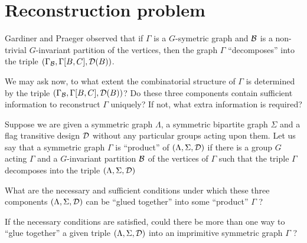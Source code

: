 \section{Reconstruction problem}

Gardiner and Praeger observed that if $\Gamma$ is a $G$-symetric graph
and $\mathcal{B}$ is a non-trivial $G$-invariant partition of the vertices,
then the graph $\Gamma$ ``decomposes''
into the triple $(\Gamma_{\mathcal{B}}, \Gamma[B,C], \mathcal{D}(B))$.

We may ask now, to what extent the combinatorial structure of $\Gamma$
is determined by the triple $(\Gamma_{\mathcal{B}}, \Gamma[B,C], \mathcal{D}(B))$?
Do these three components contain sufficient information
to reconstruct $\Gamma$ uniquely?
If not, what extra information is required?



Suppose we are given a symmetric graph $\Lambda$,
a symmetric bipartite graph $\Sigma$ and a flag transitive design
$\mathcal{D}$ without any particular groups acting upon them.
Let us say that a symmetric graph $\Gamma$ is 
``product'' of $(\Lambda, \Sigma, \mathcal{D})$ if there is a group $G$
acting $\Gamma$ and a $G$-invariant partition $\mathcal{B}$ of
the vertices of $\Gamma$
such that the triple $\Gamma$ decomposes into the triple
$(\Lambda, \Sigma, \mathcal{D})$ 

What are the necessary and sufficient
conditions under which these three components $(\Lambda, \Sigma, \mathcal{D})$
can be ``glued together'' into some ``product'' $\Gamma$ ?

If the necessary conditions are satisfied,
could there be more than one way to ``glue together'' a given 
triple $(\Lambda, \Sigma, \mathcal{D})$ into an imprimitive symmetric graph 
$\Gamma$ ?

%
%


